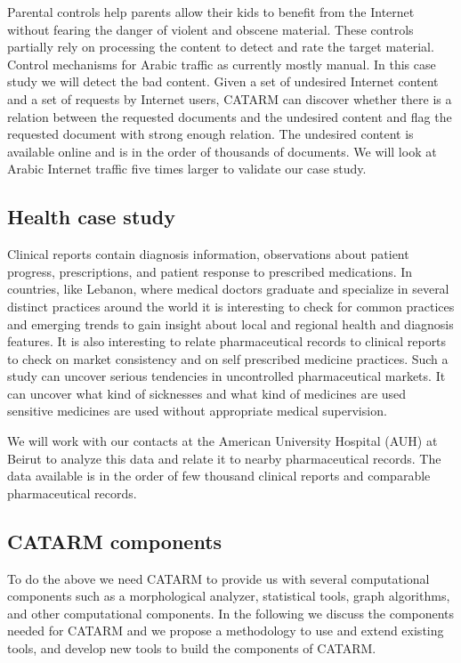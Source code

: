 \documentclass[12pt]{article}
\begin{document}
Parental controls help parents allow their kids to benefit 
from the Internet 
without fearing the danger of violent and obscene material. 
These controls partially rely on processing the content to detect 
and rate the target material. 
Control mechanisms for Arabic traffic as currently mostly manual. 
In this case study we will detect the bad content. 
Given a set of undesired Internet content 
and a set of requests by Internet users, 
CATARM can discover whether there is a relation between 
the requested documents and the undesired content and flag the 
requested document with strong enough relation. 
The undesired content is available online and is in the 
order of thousands of documents. 
We will look at Arabic Internet traffic five times larger to
validate our case study. 


\subsection{Health case study}
\label{s:design:med}

Clinical reports contain diagnosis information, observations about 
patient progress, prescriptions, and patient response to prescribed 
medications. 
In countries, like Lebanon, where medical doctors graduate and 
specialize 
in several distinct practices around the world it is interesting to 
check for common practices and emerging trends to gain insight
about local and regional health and diagnosis features. 
It is also interesting to relate 
pharmaceutical 
records to clinical reports to check on 
market consistency and on self prescribed medicine 
practices.
Such a study can uncover serious tendencies in uncontrolled
pharmaceutical markets.
It can uncover what kind of sicknesses and what kind of medicines
are used sensitive medicines are used without 
appropriate medical supervision. 

We will work with our contacts at the American University
Hospital (AUH) at Beirut to analyze this data and relate it
to nearby pharmaceutical records. 
The data available is in the order of few thousand clinical reports
and comparable pharmaceutical records. 


\subsection{CATARM components}
\label{s:design:components}

To do the above we need CATARM to provide us with several 
computational components such as a morphological analyzer, 
statistical tools, graph algorithms, and other computational
components. 
In the following we discuss the components needed for 
CATARM and we propose a methodology to 
use and extend existing tools, and develop new tools to
build the components of CATARM.
\end{document}
